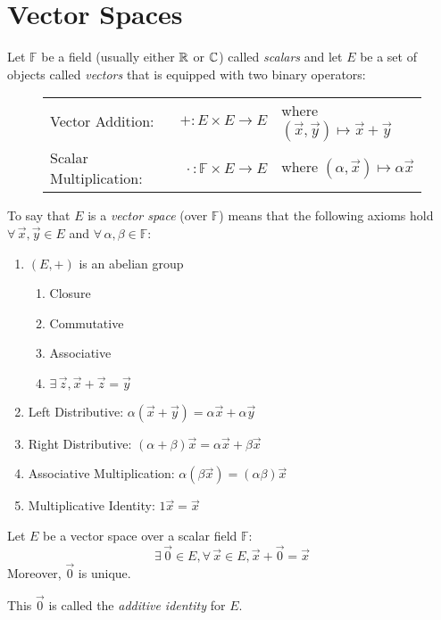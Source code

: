 \documentclass[letterpaper,12pt,fleqn]{article}
\newcommand{\F}{\mathbb{F}}
\renewcommand{\a}{\alpha}
\renewcommand{\b}{\beta}
\newcommand{\vx}{\vec{x}}
\newcommand{\vy}{\vec{y}}
\newcommand{\vz}{\vec{z}}
\newcommand{\vo}{\vec{0}}
\begin{document}
\section*{Vector Spaces}

\begin{definition}
  Let $\F$ be a field (usually either $\mathbb{R}$ or $\mathbb{C}$) called \emph{scalars} and
  let $E$ be a set of objects called \emph{vectors} that is equipped with two
  binary operators:

  \begin{figure}[h]
    \setlength{\leftskip}{0.5in}
    \begin{tabular}{lrl}
      Vector Addition: & $+:E\times E\to E$ & where
      $(\vx,\vy)\mapsto \vx+\vy$ \\
      Scalar Multiplication: & $\cdot\,:\F\times E\to E$ & where
      $(\a,\vx)\mapsto \a\vx$
    \end{tabular}
  \end{figure}

  To say that $E$ is a \emph{vector space} (over $\F$) means that the following
  axioms hold $\forall\,\vx,\vy\in E$ and $\forall\,\a,\b\in\F$:
  \begin{enumerate}
  \item $(E,+)$ is an abelian group
    \begin{enumerate}
    \item Closure
    \item Commutative
    \item Associative
    \item $\exists\,\vz,\vx+\vz=\vy$
    \end{enumerate}

  \item Left Distributive: $\a(\vx+\vy)=\a\vx+\a\vy$

  \item Right Distributive: $(\a+\b)\vx=\a\vx+\b\vx$

  \item Associative Multiplication: $\a(\b\vx)=(\a\b)\vx$

  \item Multiplicative Identity: $1\vx=\vx$
  \end{enumerate}
\end{definition}

\begin{theorem}
  Let $E$ be a vector space over a scalar field $\F$:
  \[\exists\,\vo\in E,\forall\,\vx\in E,\vx+\vo=\vx\]
  Moreover, $\vo$ is unique.

  This $\vo$ is called the \emph{additive identity} for $E$.
\end{theorem}
\end{document}
